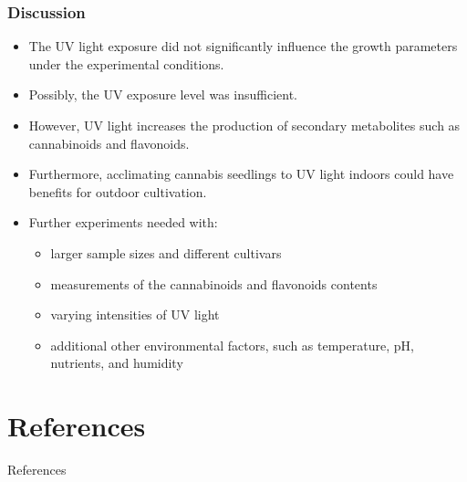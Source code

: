 \documentclass[
    12pt,
    aspectratio=1610,
    b,
    bibliography=../bibliography.bib,
    link-citations]{beamer}
\begin{document}
    \begin{frame}
        \frametitle{Discussion}
        \begin{itemize}
            \item The UV light exposure did not significantly influence the growth parameters under the experimental conditions.
            \item Possibly, the UV exposure level was insufficient.
            \item However, UV light increases the production of secondary metabolites such as cannabinoids and flavonoids.
            \item Furthermore, acclimating cannabis seedlings to UV light indoors could have benefits for outdoor cultivation.
            \item Further experiments needed with:
            \begin{itemize}
                \item larger sample sizes and different cultivars
                \item measurements of the cannabinoids and flavonoids contents
                \item varying intensities of UV light
                \item additional other environmental factors, such as temperature, pH, nutrients, and humidity
            \end{itemize}
        \end{itemize}
    \end{frame}

    \section{References}

    \begin{frame}[allowframebreaks]{References}
        \renewcommand*{\bibfont}{\footnotesize}
        \printbibliography[heading=none]
    \end{frame}
\end{document}
